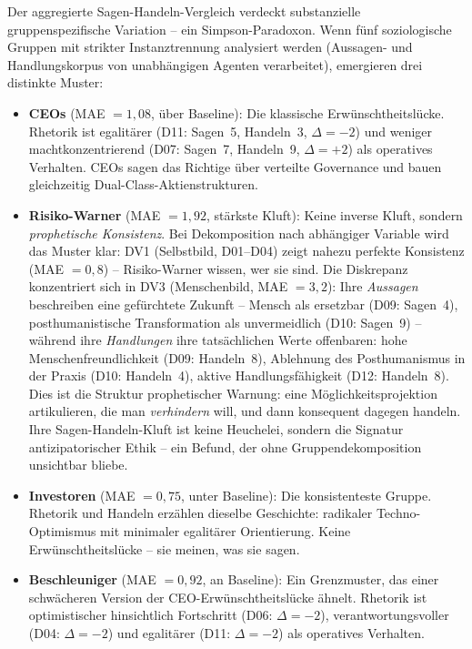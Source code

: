 \documentclass[12pt,a4paper]{article}
\begin{document}
Der aggregierte Sagen-Handeln-Vergleich verdeckt substanzielle gruppenspezifische Variation -- ein Simpson-Paradoxon. Wenn fünf soziologische Gruppen mit strikter Instanztrennung analysiert werden (Aussagen- und Handlungskorpus von unabhängigen Agenten verarbeitet), emergieren drei distinkte Muster:

\begin{itemize}
\item \textbf{CEOs} (MAE $= 1{,}08$, über Baseline): Die klassische Erwünschtheitslücke. Rhetorik ist egalitärer (D11: Sagen~5, Handeln~3, $\Delta = -2$) und weniger machtkonzentrierend (D07: Sagen~7, Handeln~9, $\Delta = +2$) als operatives Verhalten. CEOs sagen das \glqq Richtige\grqq{} über verteilte Governance und bauen gleichzeitig Dual-Class-Aktienstrukturen.

\item \textbf{Risiko-Warner} (MAE $= 1{,}92$, stärkste Kluft): Keine inverse Kluft, sondern \emph{prophetische Konsistenz}. Bei Dekomposition nach abhängiger Variable wird das Muster klar: DV1 (Selbstbild, D01--D04) zeigt nahezu perfekte Konsistenz (MAE $= 0{,}8$) -- Risiko-Warner wissen, wer sie sind. Die Diskrepanz konzentriert sich in DV3 (Menschenbild, MAE $= 3{,}2$): Ihre \emph{Aussagen} beschreiben eine gefürchtete Zukunft -- Mensch als ersetzbar (D09: Sagen~4), posthumanistische Transformation als unvermeidlich (D10: Sagen~9) -- während ihre \emph{Handlungen} ihre tatsächlichen Werte offenbaren: hohe Menschenfreundlichkeit (D09: Handeln~8), Ablehnung des Posthumanismus in der Praxis (D10: Handeln~4), aktive Handlungsfähigkeit (D12: Handeln~8). Dies ist die Struktur prophetischer Warnung: eine Möglichkeitsprojektion artikulieren, die man \emph{verhindern} will, und dann konsequent dagegen handeln. Ihre Sagen-Handeln-Kluft ist keine Heuchelei, sondern die Signatur antizipatorischer Ethik -- ein Befund, der ohne Gruppendekomposition unsichtbar bliebe.

\item \textbf{Investoren} (MAE $= 0{,}75$, unter Baseline): Die konsistenteste Gruppe. Rhetorik und Handeln erzählen dieselbe Geschichte: radikaler Techno-Optimismus mit minimaler egalitärer Orientierung. Keine Erwünschtheitslücke -- sie meinen, was sie sagen.

\item \textbf{Beschleuniger} (MAE $= 0{,}92$, an Baseline): Ein Grenzmuster, das einer schwächeren Version der CEO-Erwünschtheitslücke ähnelt. Rhetorik ist optimistischer hinsichtlich Fortschritt (D06: $\Delta = -2$), verantwortungsvoller (D04: $\Delta = -2$) und egalitärer (D11: $\Delta = -2$) als operatives Verhalten.
\end{itemize}
\end{document}
